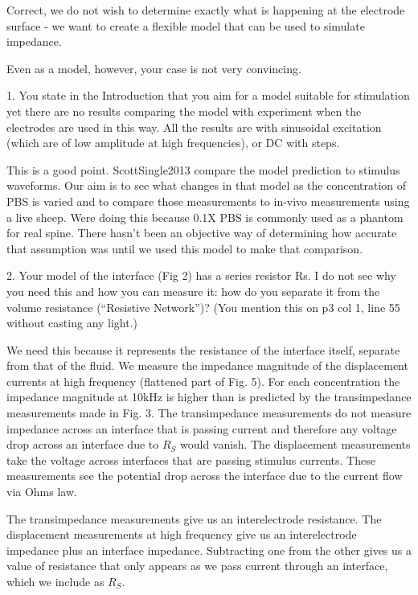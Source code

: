 \documentclass[journal, a4paper]{IEEEtran}
\begin{document}
{    {
        \color{blue}
        Correct, we do not wish to determine exactly what is happening at the electrode surface - we want to create a flexible model that can be used to simulate impedance.

    }


    Even as a model, however, your case is not very convincing.

    1. You state in the Introduction that you aim for a model suitable for stimulation yet there are no results comparing the model with experiment when the electrodes are used in this way. All the results are with sinusoidal excitation (which are of low amplitude at high frequencies), or DC with steps.

    {
        \color{blue}
        This is a good point. ScottSingle2013 compare the model prediction to stimulus waveforms. Our aim is to see what changes in that model as the concentration of PBS is varied and to compare those measurements to in-vivo measurements using a live sheep. Were doing this because 0.1X PBS is commonly used as a phantom for real spine. There hasn't been an objective way of determining how accurate that assumption was until we used this model to make that comparison.
    }

    2. Your model of the interface (Fig 2) has a series resistor Rs. I do not see why you need this and how you can measure it: how do you separate it from the volume resistance (``Resistive Network'')? (You mention this on p3 col 1, line 55 without casting any light.)

    {
        \color{blue}
        We need this because it represents the resistance of the interface itself, separate from that of the fluid.
        We measure the impedance magnitude of the displacement currents at high frequency (flattened part of Fig. 5). For each concentration the impedance magnitude at 10kHz is higher than is predicted by the transimpedance measurements made in Fig. 3. The transimpedance measurements do not measure impedance across an interface that is passing current and therefore any voltage drop across an interface due to $R_{S}$ would vanish. The displacement measurements take the voltage across interfaces that are passing stimulus currents. These measurements see the potential drop across the interface due to the current flow via Ohms law.

        The transimpedance measurements give us an interelectrode resistance. The displacement measurements at high frequency give us an interelectrode impedance plus an interface impedance. Subtracting one from the other gives us a value of resistance that only appears as we pass current through an interface, which we include as $R_{S}$.
    }

}
\end{document}

